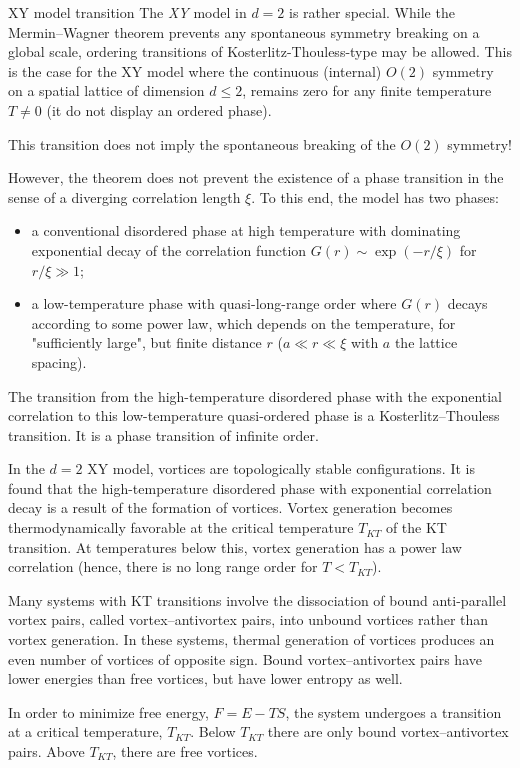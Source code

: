 \documentclass[../main/main.tex]{subfiles}
\begin{document}
\begin{example}{XY model transition}{}
The \emph{XY} model in \( d=2 \) is rather special. While the Mermin–Wagner theorem prevents any spontaneous symmetry breaking on a global scale, ordering transitions of Kosterlitz-Thouless-type may be allowed.
 This is the case for the XY model where the continuous (internal) \( O(2) \) symmetry on a spatial lattice of dimension \(d \le 2\),  remains zero for any finite temperature \( T \neq 0 \) (it do not display an ordered phase).
\begin{remark}
This transition does not imply the spontaneous breaking of the \( O(2) \) symmetry!
\end{remark} 
However, the theorem does not prevent the existence of a phase transition in the sense of a diverging correlation length \(\xi\). To this end, the model has two phases: 
\begin{itemize}
    \item a conventional disordered phase at high temperature with dominating exponential decay of the correlation function 
\(G(r)\sim \exp(-r/\xi )\) for \(r/\xi \gg 1\);
\item a low-temperature phase with quasi-long-range order where \(G(r)\) decays according to some power law, which depends on the temperature, for "sufficiently large", but finite distance \(r\) (\(a \ll r \ll \xi\) with \(a\) the lattice spacing).
\end{itemize}

The transition from the high-temperature disordered phase with the exponential correlation to this low-temperature quasi-ordered phase is a Kosterlitz–Thouless transition. It is a phase transition of infinite order.

In the \(d=2\) XY model, vortices are topologically stable configurations. It is found that the high-temperature disordered phase with exponential correlation decay is a result of the formation of vortices. Vortex generation becomes thermodynamically favorable at the critical temperature \(T_{KT}\) of the KT transition. At temperatures below this, vortex generation has a power law correlation (hence, there is no long range order for \( T<T_{KT} \)).

Many systems with KT transitions involve the dissociation of bound anti-parallel vortex pairs, called vortex–antivortex pairs, into unbound vortices rather than vortex generation. In these systems, thermal generation of vortices produces an even number of vortices of opposite sign. Bound vortex–antivortex pairs have lower energies than free vortices, but have lower entropy as well.

In order to minimize free energy, \(F=E-TS\), the system undergoes a transition at a critical temperature, \(T_{KT}\).
Below \(T_{KT}\) there are only bound vortex–antivortex pairs. Above \(T_{KT}\), there are free vortices.
\end{example}
\end{document}

